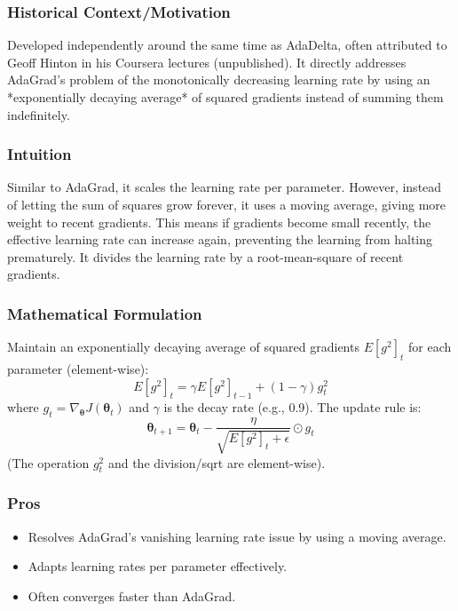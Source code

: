 \documentclass{article}
\newcommand{\btheta}{\bm{\theta}}
\begin{document}
\subsubsection{Historical Context/Motivation}
Developed independently around the same time as AdaDelta, often attributed to Geoff Hinton in his Coursera lectures (unpublished). It directly addresses AdaGrad's problem of the monotonically decreasing learning rate by using an *exponentially decaying average* of squared gradients instead of summing them indefinitely.

\subsubsection{Intuition}
Similar to AdaGrad, it scales the learning rate per parameter. However, instead of letting the sum of squares grow forever, it uses a moving average, giving more weight to recent gradients. This means if gradients become small recently, the effective learning rate can increase again, preventing the learning from halting prematurely. It divides the learning rate by a root-mean-square of recent gradients.

\subsubsection{Mathematical Formulation}
Maintain an exponentially decaying average of squared gradients $E[g^2]_t$ for each parameter (element-wise):
\begin{equation}
    E[g^2]_t = \gamma E[g^2]_{t-1} + (1-\gamma) g_t^2
\end{equation}
where $g_t = \nabla_{\btheta} J(\btheta_t)$ and $\gamma$ is the decay rate (e.g., 0.9). The update rule is:
\begin{equation}
    \btheta_{t+1} = \btheta_t - \frac{\eta}{\sqrt{E[g^2]_t + \epsilon}} \odot g_t
\end{equation}
(The operation $g_t^2$ and the division/sqrt are element-wise).

\subsubsection{Pros}
\begin{itemize}
    \item Resolves AdaGrad's vanishing learning rate issue by using a moving average.
    \item Adapts learning rates per parameter effectively.
    \item Often converges faster than AdaGrad.
\end{itemize}
\end{document}
